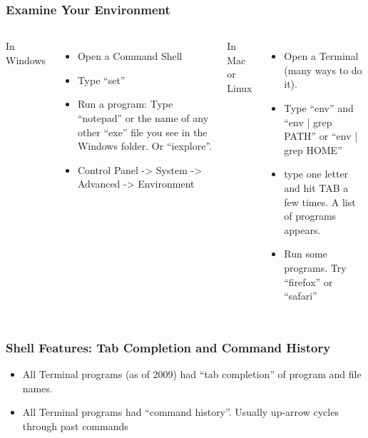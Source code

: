 \documentclass[English]{beamer}
\begin{document}


\begin{frame}
  \frametitle{Examine Your Environment}
  \begin{columns}
    \column{5cm}
  In Windows
  \begin{itemize}
  \item Open a Command Shell
  \item Type ``set''
  \item Run a program: Type ``notepad'' or the name of any other
    ``exe'' file you see in the Windows folder. Or ``iexplore''.
  \item Control Panel -> System -> Advanced -> Environment
  \end{itemize} 
  \column{6cm}
    In Mac or Linux
    \begin{itemize}
    \item Open a Terminal (many ways to do it).
    \item Type ``env'' and ``env | grep PATH'' or ``env | grep HOME''
    \item type one letter and hit TAB a few times. A list of programs appears.
    \item Run some programs. Try ``firefox'' or ``safari''
    \end{itemize}
  \end{columns}
 
\end{frame}



\begin{frame}
  \frametitle{Shell Features: Tab Completion and Command History}
\begin{itemize}
  \item   All Terminal programs (as of 2009) had ``tab completion'' of
    program and file names.
  \item All Terminal programs had ``command  history''. Usually
    up-arrow cycles through past commands
  \end{itemize}
\end{frame}
\end{document}

